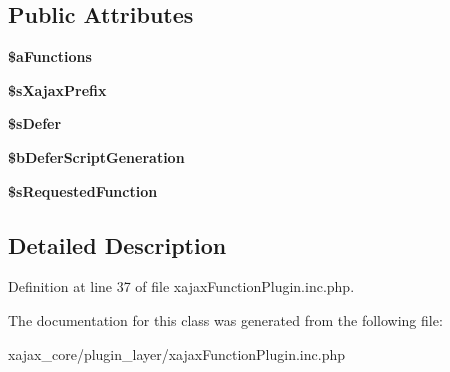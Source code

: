 \subsection*{Public Attributes}
\begin{DoxyCompactItemize}
\item 
\hypertarget{classxajaxFunctionPlugin_a40a0ace3ecd47d489efbbba46f3c73ee}{
{\bfseries \$aFunctions}}
\label{classxajaxFunctionPlugin_a40a0ace3ecd47d489efbbba46f3c73ee}

\item 
\hypertarget{classxajaxFunctionPlugin_af1c23624c04edef4930034079f5098c7}{
{\bfseries \$sXajaxPrefix}}
\label{classxajaxFunctionPlugin_af1c23624c04edef4930034079f5098c7}

\item 
\hypertarget{classxajaxFunctionPlugin_abe5fcc000e55444c7e42fb14ba47c4e6}{
{\bfseries \$sDefer}}
\label{classxajaxFunctionPlugin_abe5fcc000e55444c7e42fb14ba47c4e6}

\item 
\hypertarget{classxajaxFunctionPlugin_a0f6d05dfe7d95e60fce99224f3ac5e3e}{
{\bfseries \$bDeferScriptGeneration}}
\label{classxajaxFunctionPlugin_a0f6d05dfe7d95e60fce99224f3ac5e3e}

\item 
\hypertarget{classxajaxFunctionPlugin_a4f28019138d3977f1166f0dd19a22946}{
{\bfseries \$sRequestedFunction}}
\label{classxajaxFunctionPlugin_a4f28019138d3977f1166f0dd19a22946}

\end{DoxyCompactItemize}


\subsection{Detailed Description}


Definition at line 37 of file xajaxFunctionPlugin.inc.php.



The documentation for this class was generated from the following file:\begin{DoxyCompactItemize}
\item 
xajax\_\-core/plugin\_\-layer/xajaxFunctionPlugin.inc.php\end{DoxyCompactItemize}
